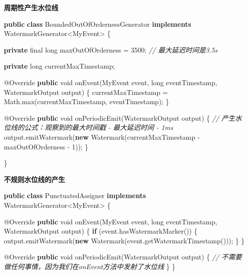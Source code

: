 \documentclass[cn,11pt,chinese]{elegantbook}
\newenvironment{Shaded}{}{}
\newcommand{\AttributeTok}[1]{\textcolor[rgb]{0.49,0.56,0.16}{#1}}
\newcommand{\BuiltInTok}[1]{#1}
\newcommand{\CommentTok}[1]{\textcolor[rgb]{0.38,0.63,0.69}{\textit{#1}}}
\newcommand{\DataTypeTok}[1]{\textcolor[rgb]{0.56,0.13,0.00}{#1}}
\newcommand{\DecValTok}[1]{\textcolor[rgb]{0.25,0.63,0.44}{#1}}
\newcommand{\FunctionTok}[1]{\textcolor[rgb]{0.02,0.16,0.49}{#1}}
\newcommand{\KeywordTok}[1]{\textcolor[rgb]{0.00,0.44,0.13}{\textbf{#1}}}
\newcommand{\NormalTok}[1]{#1}
\begin{document}
\textbf{周期性产生水位线}

\begin{Shaded}
\begin{Highlighting}[]
\KeywordTok{public} \KeywordTok{class}\NormalTok{ BoundedOutOfOrdernessGenerator }\KeywordTok{implements}\NormalTok{ WatermarkGenerator\textless{}MyEvent\textgreater{} \{}

    \KeywordTok{private} \DataTypeTok{final} \DataTypeTok{long}\NormalTok{ maxOutOfOrderness = }\DecValTok{3500}\NormalTok{; }\CommentTok{// 最大延迟时间是3.5s}

    \KeywordTok{private} \DataTypeTok{long}\NormalTok{ currentMaxTimestamp;}

    \AttributeTok{@Override}
    \KeywordTok{public} \DataTypeTok{void} \FunctionTok{onEvent}\NormalTok{(MyEvent event, }\DataTypeTok{long}\NormalTok{ eventTimestamp, WatermarkOutput output) \{}
\NormalTok{        currentMaxTimestamp = }\BuiltInTok{Math}\NormalTok{.}\FunctionTok{max}\NormalTok{(currentMaxTimestamp, eventTimestamp);}
\NormalTok{    \}}

    \AttributeTok{@Override}
    \KeywordTok{public} \DataTypeTok{void} \FunctionTok{onPeriodicEmit}\NormalTok{(WatermarkOutput output) \{}
        \CommentTok{// 产生水位线的公式：观察到的最大时间戳 {-} 最大延迟时间 {-} 1ms}
\NormalTok{        output.}\FunctionTok{emitWatermark}\NormalTok{(}\KeywordTok{new} \FunctionTok{Watermark}\NormalTok{(currentMaxTimestamp {-} maxOutOfOrderness {-} }\DecValTok{1}\NormalTok{));}
\NormalTok{    \}}

\NormalTok{\}}
\end{Highlighting}
\end{Shaded}

\textbf{不规则水位线的产生}

\begin{Shaded}
\begin{Highlighting}[]
\KeywordTok{public} \KeywordTok{class}\NormalTok{ PunctuatedAssigner }\KeywordTok{implements}\NormalTok{ WatermarkGenerator\textless{}MyEvent\textgreater{} \{}

    \AttributeTok{@Override}
    \KeywordTok{public} \DataTypeTok{void} \FunctionTok{onEvent}\NormalTok{(MyEvent event, }\DataTypeTok{long}\NormalTok{ eventTimestamp, WatermarkOutput output) \{}
        \KeywordTok{if}\NormalTok{ (event.}\FunctionTok{hasWatermarkMarker}\NormalTok{()) \{}
\NormalTok{            output.}\FunctionTok{emitWatermark}\NormalTok{(}\KeywordTok{new} \FunctionTok{Watermark}\NormalTok{(event.}\FunctionTok{getWatermarkTimestamp}\NormalTok{()));}
\NormalTok{        \}}
\NormalTok{    \}}

    \AttributeTok{@Override}
    \KeywordTok{public} \DataTypeTok{void} \FunctionTok{onPeriodicEmit}\NormalTok{(WatermarkOutput output) \{}
        \CommentTok{// 不需要做任何事情，因为我们在onEvent方法中发射了水位线}
\NormalTok{    \}}
\NormalTok{\}}
\end{Highlighting}
\end{Shaded}
\end{document}
